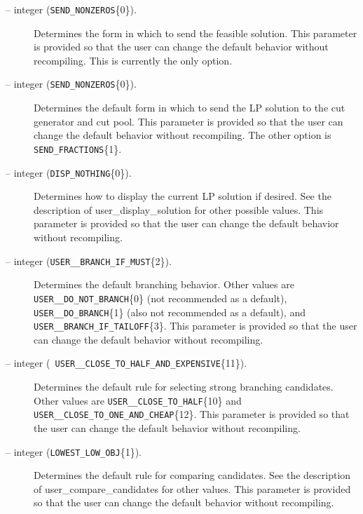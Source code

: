 \begin{description}
\item[ -- integer 
({\tt SEND\_NONZEROS}\{0\}).] 
Determines the form in which to send the feasible solution. This
parameter is provided so that the user can change the default behavior
without recompiling. This is currently the only option.

\item[ -- integer ({\tt SEND\_NONZEROS}\{0\}).] 
Determines the default form in which to send the LP solution to the
cut generator and cut pool. This
parameter is provided so that the user can change the default behavior
without recompiling. The other option is {\tt SEND\_FRACTIONS}\{1\}.

\item[ -- integer ({\tt DISP\_NOTHING}\{0\}).] 
Determines how to display the current LP solution if desired.
See the description of 
{user_display_solution} for other
possible values. This parameter is provided so that
the user can change the default behavior without recompiling.

\item[ -- integer 
({\tt USER\_\_BRANCH\_IF\_MUST}\{2\}).] 
Determines the default branching behavior. Other values are {\tt
USER\_\_DO\_NOT\_BRANCH}\{0\} (not recommended as a default), {\tt
USER\_\_DO\_BRANCH}\{1\} (also not recommended as a default), and {\tt
USER\_\_BRANCH\_IF\_TAILOFF}\{3\}. This
parameter is provided so that the user can change the default behavior
without recompiling.

\item[ -- integer ({\tt
USER\_\_CLOSE\_TO\_HALF\_AND\_EXPENSIVE}\{11\}).] 
Determines the default rule for selecting strong branching candidates.
Other values are {\tt USER\_\_CLOSE\_TO\_HALF}\{10\} and 
{\tt USER\_\_CLOSE\_TO\_ONE\_AND\_CHEAP}\{12\}. This
parameter is provided so that the user can change the default behavior
without recompiling.

\item[ -- integer 
({\tt LOWEST\_LOW\_OBJ}\{1\}).] 
Determines the default rule for comparing candidates. See the
description of 
{user_compare_candidates} for other values. This
parameter is provided so that the user can change the default behavior
without recompiling.


\end{description}
